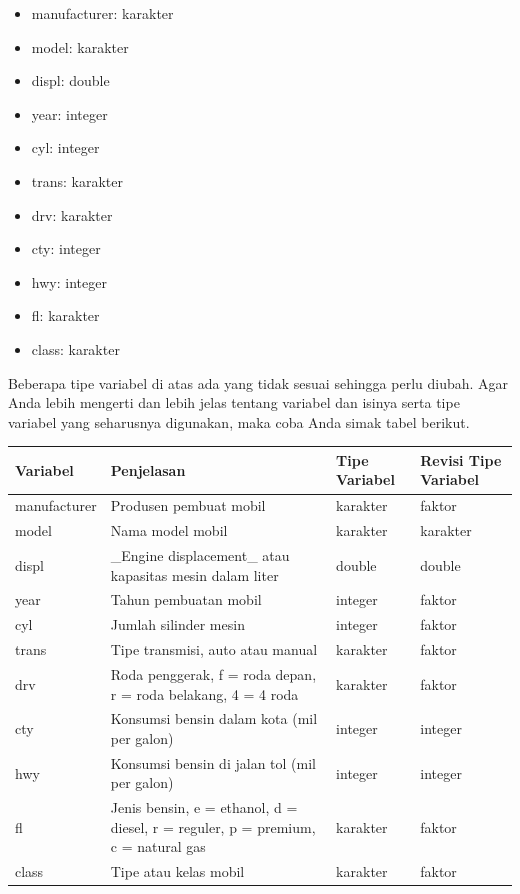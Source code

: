 \documentclass[openany]{book}
\providecommand{\tightlist}{%
  \setlength{\itemsep}{0pt}\setlength{\parskip}{0pt}}
\begin{document}
\begin{itemize}
\tightlist
\item
  manufacturer: karakter
\item
  model: karakter
\item
  displ: double
\item
  year: integer
\item
  cyl: integer
\item
  trans: karakter
\item
  drv: karakter
\item
  cty: integer
\item
  hwy: integer
\item
  fl: karakter
\item
  class: karakter
\end{itemize}

Beberapa tipe variabel di atas ada yang tidak sesuai sehingga perlu
diubah. Agar Anda lebih mengerti dan lebih jelas tentang variabel dan
isinya serta tipe variabel yang seharusnya digunakan, maka coba Anda
simak tabel berikut.

\begin{tabular}{l|l|l|l}
\hline
Variabel & Penjelasan & Tipe Variabel & Revisi Tipe Variabel\\
\hline
manufacturer & Produsen pembuat mobil & karakter & faktor\\
\hline
model & Nama model mobil & karakter & karakter\\
\hline
displ & \_Engine displacement\_ atau kapasitas mesin dalam liter & double & double\\
\hline
year & Tahun pembuatan mobil & integer & faktor\\
\hline
cyl & Jumlah silinder mesin & integer & faktor\\
\hline
trans & Tipe transmisi, auto atau manual & karakter & faktor\\
\hline
drv & Roda penggerak, f = roda depan, r = roda belakang, 4 = 4 roda & karakter & faktor\\
\hline
cty & Konsumsi bensin dalam kota (mil per galon) & integer & integer\\
\hline
hwy & Konsumsi bensin di jalan tol (mil per galon) & integer & integer\\
\hline
fl & Jenis bensin, e = ethanol, d = diesel, r = reguler, p = premium, c = natural gas & karakter & faktor\\
\hline
class & Tipe atau kelas mobil & karakter & faktor\\
\hline
\end{tabular}
\end{document}
